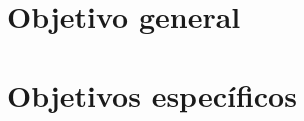 \section{Objetivo general}
\begin{spacing}{1.5}
\end{spacing}
\section{Objetivos espec\'{i}ficos}
\begin{spacing}{1.5}
\end{spacing}


	
